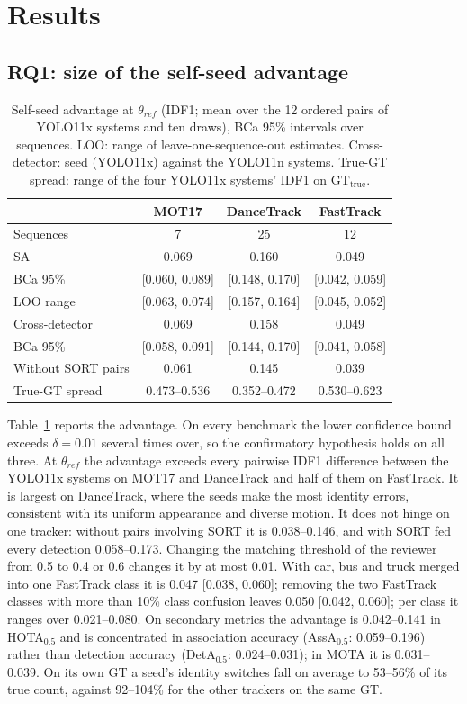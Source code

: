 \documentclass[final,times,twocolumn]{elsarticle}
\newcommand{\SA}{\mathrm{SA}}
\newcommand{\gtt}{\mathrm{GT}_{\mathrm{true}}}
\begin{document}
\section{Results}
\label{sec:results}

\subsection{RQ1: size of the self-seed advantage}

\begin{table}[t]
\centering
\caption{Self-seed advantage at $\theta_{ref}$ (IDF1; mean over the 12 ordered pairs of YOLO11x systems
and ten draws), BCa 95\% intervals over sequences. LOO: range of leave-one-sequence-out estimates.
Cross-detector: seed (YOLO11x) against the YOLO11n systems. True-GT spread: range of the four YOLO11x
systems' IDF1 on $\gtt$.}
\label{tab:h1}
\small
\setlength{\tabcolsep}{1.2pt}
\begin{tabular}{@{}lccc@{}}
\toprule
 & MOT17 & DanceTrack & FastTrack \\
\midrule
Sequences & 7 & 25 & 12 \\
$\SA$ & 0.069 & 0.160 & 0.049 \\
BCa 95\% & [0.060, 0.089] & [0.148, 0.170] & [0.042, 0.059] \\
LOO range & [0.063, 0.074] & [0.157, 0.164] & [0.045, 0.052] \\
Cross-detector & 0.069 & 0.158 & 0.049 \\
\quad BCa 95\% & [0.058, 0.091] & [0.144, 0.170] & [0.041, 0.058] \\
Without SORT pairs & 0.061 & 0.145 & 0.039 \\
True-GT spread & 0.473--0.536 & 0.352--0.472 & 0.530--0.623 \\
\bottomrule
\end{tabular}
\end{table}

Table~\ref{tab:h1} reports the advantage. On every benchmark the lower confidence bound exceeds
$\delta = 0.01$ several times over, so the confirmatory hypothesis holds on all three. At $\theta_{ref}$
the advantage exceeds every pairwise IDF1 difference between the YOLO11x systems on MOT17 and DanceTrack
and half of them on FastTrack. It is largest on DanceTrack, where the seeds make the most identity errors,
consistent with its uniform appearance and diverse motion. It does not hinge on one tracker: without pairs
involving SORT it is 0.038--0.146, and with SORT fed every detection 0.058--0.173. Changing the matching
threshold of the reviewer from 0.5 to 0.4 or 0.6 changes it by at most 0.01. With car, bus and truck merged
into one FastTrack class it is 0.047 [0.038, 0.060]; removing the two FastTrack classes with more than
10\% class confusion leaves 0.050 [0.042, 0.060]; per class it ranges over 0.021--0.080. On secondary
metrics the advantage is 0.042--0.141 in HOTA$_{0.5}$ and is concentrated in association accuracy
(AssA$_{0.5}$: 0.059--0.196) rather than detection accuracy (DetA$_{0.5}$: 0.024--0.031); in MOTA it is
0.031--0.039. On its own GT a seed's identity switches fall on average to 53--56\% of its true count,
against 92--104\% for the other trackers on the same GT.
\end{document}
